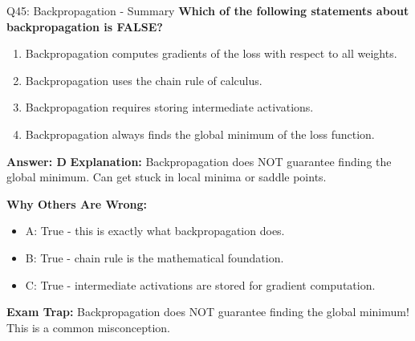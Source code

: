 \documentclass[8pt]{beamer}
\begin{document}
	\begin{frame}{Q45: Backpropagation - Summary}
		\fontsize{6.5}{7.5}\selectfont
		\textbf{Which of the following statements about backpropagation is FALSE?}
		
		\begin{enumerate}
			\item Backpropagation computes gradients of the loss with respect to all weights.
			\item Backpropagation uses the chain rule of calculus.
			\item Backpropagation requires storing intermediate activations.
			\item Backpropagation always finds the global minimum of the loss function.
		\end{enumerate}
		
		\vspace{0.05cm}
		\textcolor{myblue}{\textbf{Answer: D}}
		\vspace{0.05cm}
		\textcolor{myblue}{\textbf{Explanation:}} Backpropagation does NOT guarantee finding the global minimum. Can get stuck in local minima or saddle points.
		
		\vspace{0.05cm}
		\textcolor{myred}{\textbf{Why Others Are Wrong:}}
		\begin{itemize}
			\item \textcolor{myred}{A:} True - this is exactly what backpropagation does.
			\item \textcolor{myred}{B:} True - chain rule is the mathematical foundation.
			\item \textcolor{myred}{C:} True - intermediate activations are stored for gradient computation.
		\end{itemize}
		
		\textcolor{myred}{\textbf{Exam Trap:}} Backpropagation does \textcolor{myred}{NOT} guarantee finding the global minimum! This is a common misconception.
	\end{frame}
	
	
\end{document}
